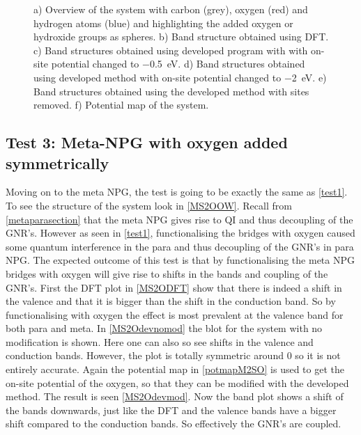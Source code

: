 \begin{figure}[H]
\begin{subfigure}[b]{0.8\textwidth}
		\vspace{-0.5\baselineskip}
		\caption{}
		\label{potmapPS4OH}
	\end{subfigure}
	\caption{a) Overview of the system with carbon (grey), oxygen (red) and hydrogen atoms (blue) and highlighting the added oxygen or hydroxide groups as spheres. b) Band structure obtained using DFT. c) Band structures obtained using developed program with with on-site potential changed to \SI{-0.5}{\electronvolt}. d) Band structures obtained using developed method with on-site potential changed to \SI{-2}{\electronvolt}. e) Band structures obtained using the developed method with sites removed. f) Potential map of the system.}
	\label{PS4OH}
\end{figure}
\subsection{Test 3: Meta-NPG with oxygen added symmetrically}\label{test3}
Moving on to the meta NPG, the test is going to be exactly the same as \cref{test1}. To see the structure of the system look in \cref{MS2OOW}. Recall from \cref{metaparasection} that the meta NPG gives rise to QI and thus decoupling of the GNR's. However as seen in \cref{test1}, functionalising the bridges with oxygen caused some quantum interference in the para and thus decoupling of the GNR's in para NPG. The expected outcome of this test is that by functionalising the meta NPG bridges with oxygen will give rise to shifts in the bands and coupling of the GNR's. First the DFT plot in \cref{MS2ODFT} show that there is indeed a shift in the valence and that it is bigger than the shift in the conduction band. So by functionalising with oxygen the effect is most prevalent at the valence band for both para and meta. In \cref{MS2Odevnomod} the blot for the system with no modification is shown. Here one can also so see shifts in the valence and conduction bands. However, the plot is totally symmetric around 0 so it is not entirely accurate. Again the potential map in \cref{potmapM2SO} is used to get the on-site potential of the oxygen, so that they can be modified with the developed method. The result is seen \cref{MS2Odevmod}. Now the band plot shows a shift of the bands downwards, just like the DFT and the valence bands have a bigger shift compared to the conduction bands. So effectively the GNR's are coupled.
